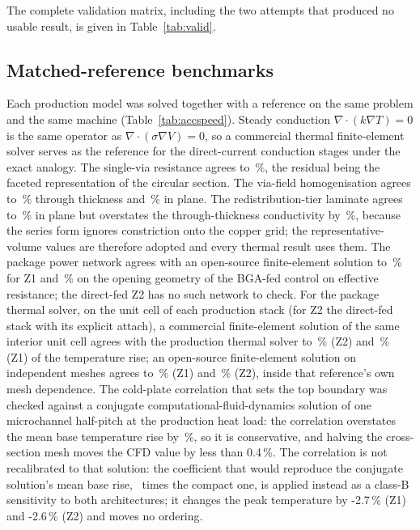 \documentclass[journal]{IEEEtran}
\begin{document}
The complete validation matrix, including the two attempts that produced no usable result,
is given in Table~\ref{tab:valid}.

\subsection{Matched-reference benchmarks}\label{sec:matched}
Each production model was solved together with a reference on the same problem and the same
machine (Table~\ref{tab:accspeed}). Steady conduction $\nabla\!\cdot(k\nabla T)=0$ is the same
operator as $\nabla\!\cdot(\sigma\nabla V)=0$, so a commercial thermal finite-element solver
serves as the reference for the direct-current conduction stages under the exact analogy.
The single-via resistance agrees to \ErrTsvBulk\,\%, the residual being the faceted
representation of the circular section. The via-field homogenisation agrees to
\ErrTsvKz\,\% through thickness and \ErrTsvKx\,\% in plane. The redistribution-tier laminate
agrees to \ErrRdlKx\,\% in plane but overstates the through-thickness conductivity by
\ErrRdlKz\,\%, because the series form ignores constriction onto the copper grid; the
representative-volume values are therefore adopted and every thermal result uses them. The
package power network agrees with an open-source finite-element solution to
\ErrPkgRdlZone\,\% for Z1 and \ErrPkgRdlZtwo\,\% on the opening geometry of the BGA-fed control
on effective resistance; the direct-fed Z2 has no such network to check. For the package thermal solver, on the unit cell of each production stack (for Z2 the direct-fed stack with its explicit attach), a commercial finite-element solution of the same interior unit cell agrees with the production thermal solver to \ErrThermAedtZtwo\,\% (Z2) and \ErrThermAedtZone\,\% (Z1) of the temperature rise; an open-source finite-element solution on independent meshes agrees to \ErrThermMooseZone\,\% (Z1) and \ErrThermMooseZtwo\,\% (Z2), inside that reference's own mesh dependence. The cold-plate correlation that sets the top boundary was checked against a conjugate computational-fluid-dynamics solution of one microchannel half-pitch at the production heat load: the correlation overstates the mean base temperature rise by \ErrCoolingIcepak\,\%, so it is conservative, and halving the cross-section mesh moves the CFD value by less than 0.4\,\%. The correlation is not recalibrated to that solution: the coefficient that would reproduce the conjugate solution's mean base rise, \IcepakFactor\ times the compact one, is applied instead as a class-B sensitivity to both architectures; it changes the peak temperature by -2.7\,\% (Z1) and -2.6\,\% (Z2) and moves no ordering.
\end{document}
